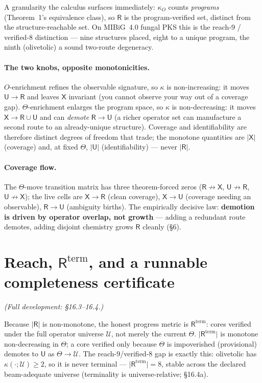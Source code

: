 \documentclass[11pt]{article}
\newcommand{\R}{\mathsf{R}}
\newcommand{\U}{\mathsf{U}}
\newcommand{\X}{\mathsf{X}}
\newcommand{\Rterm}{\mathsf{R}^{\mathrm{term}}}
\newcommand{\kO}{\kappa_{O}}
\begin{document}
A granularity the calculus surfaces immediately: $\kO$ counts \emph{programs} (Theorem~1's equivalence
class), so $\R$ is the program-verified set, distinct from the structure-reachable set. On MIBiG~4.0
fungal PKS this is the reach-9 / verified-8 distinction --- nine structures placed, eight to a unique
program, the ninth (olivetolic) a sound two-route degeneracy.

\paragraph{The two knobs, opposite monotonicities.} $O$-enrichment refines the observable signature, so
$\kappa$ is non-increasing: it moves $\U\to\R$ and leaves $\X$ invariant (you cannot observe your way
out of a coverage gap). $\Theta$-enrichment enlarges the program space, so $\kappa$ is non-decreasing:
it moves $\X\to\R\cup\U$ and can \emph{demote} $\R\to\U$ (a richer operator set can manufacture a second
route to an already-unique structure). Coverage and identifiability are therefore distinct degrees of
freedom that trade; the monotone quantities are $\lvert\X\rvert$ (coverage) and, at fixed $\Theta$,
$\lvert\U\rvert$ (identifiability) --- never $\lvert\R\rvert$.

\paragraph{Coverage flow.} The $\Theta$-move transition matrix has three theorem-forced zeros
($\R\!\not\to\!\X$, $\U\!\not\to\!\R$, $\U\!\not\to\!\X$); the live cells are $\X\to\R$ (clean coverage),
$\X\to\U$ (coverage needing an observable), $\R\to\U$ (ambiguity births). The empirically decisive law:
\textbf{demotion is driven by operator overlap, not growth} --- adding a redundant route demotes, adding
disjoint chemistry grows $\R$ cleanly (\S6).

\section{Reach, $\Rterm$, and a runnable completeness certificate}
\emph{(Full development: \S16.3--16.4.)}

Because $\lvert\R\rvert$ is non-monotone, the honest progress metric is \textbf{$\Rterm$}: cores
verified under the full operator universe $\mathcal U$, not merely the current $\Theta$.
$\lvert\Rterm\rvert$ is monotone non-decreasing in $\Theta$; a core verified only because $\Theta$ is
impoverished (provisional) demotes to $\U$ as $\Theta\to\mathcal U$. The reach-9/verified-8 gap is
exactly this: olivetolic has $\kappa(\cdot;\mathcal U)\ge2$, so it is never terminal ---
$\lvert\Rterm\rvert=8$, stable across the declared beam-adequate universe (terminality is
universe-relative; \S16.4a).
\end{document}
